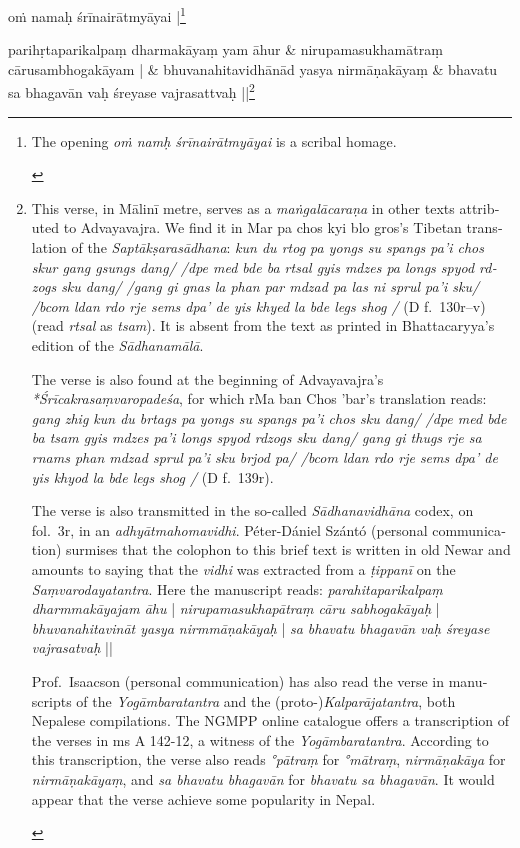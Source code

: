 \documentclass[naipra.tex]{subfiles}
\begin{document}
\beginnumbering
\begin{sanskrit}
\pstart\noindent
{}oṁ namaḥ śrīnairātmyāyai |\footnote{
	\begin{english}%
		The opening \emph{oṁ namḥ śrīnairātmyāyai} is a scribal homage.
	\end{english}
}
\pend

\medskip\versequote
parihṛtaparikalpaṃ dharmakāyaṃ yam āhur &
\hspace{20pt}nirupamasukhamātraṃ cārusambhogakāyam | \&
\versequote
bhuvanahitavidhānād yasya nirmāṇakāyaṃ &
\hspace{20pt}bhavatu sa bhagavān vaḥ śreyase vajrasattvaḥ ||\footnote{
	\begin{english}%
		This verse, in Mālinī metre, serves as a \emph{maṅgalācaraṇa} in other texts attributed to Advayavajra.
		We find it in Mar pa chos kyi blo gros's Tibetan translation of the \emph{Saptākṣarasādhana}: \emph{kun du rtog pa yongs su spangs pa'i chos skur gang gsungs dang/ /dpe med bde ba rtsal gyis mdzes pa longs spyod rdzogs sku dang/ /gang gi gnas la phan par mdzad pa las ni sprul pa'i sku/ /bcom ldan rdo rje sems dpa' de yis khyed la bde legs shog /} (D f.\ 130r–v) (read \emph{rtsal} as \emph{tsam}).
		It is absent from the text as printed in Bhattacaryya's edition of the \emph{Sādhanamālā}.

		The verse is also found at the beginning of Advayavajra's \emph{*Śrīcakrasaṃvaropadeśa}, for which rMa ban Chos 'bar's translation reads: \emph{gang zhig kun du brtags pa yongs su spangs pa'i chos sku dang/ /dpe med bde ba tsam gyis mdzes pa'i longs spyod rdzogs sku dang/ gang gi thugs rje sa rnams phan mdzad sprul pa'i sku brjod pa/ /bcom ldan rdo rje sems dpa' de yis khyod la bde legs shog /} (D f.\ 139r).

		The verse is also transmitted in the so-called \emph{Sādhanavidhāna} codex, on fol.\ 3r, in an \emph{adhyātmahomavidhi}.
		Péter-Dániel Szántó (personal communication) surmises that the colophon to this brief text is written in old Newar and amounts to saying that the \emph{vidhi} was extracted from a \emph{ṭippanī} on the \emph{Saṃvarodayatantra}. 
		Here the manuscript reads: \emph{parahitaparikalpaṃ dharmmakāyajam āhu} | \emph{nirupamasukhapātraṃ cāru sabhogakāyaḥ} | \emph{bhuvanahitavināt yasya nirmmāṇakāyaḥ} | \emph{sa bhavatu bhagavān vaḥ śreyase vajrasatvaḥ} ||

		Prof.\ Isaacson (personal communication) has also read the verse in manuscripts of the \emph{Yogāmbaratantra} and the (proto-)\emph{Kalparājatantra}, both Nepalese compilations.
		The NGMPP online catalogue offers a transcription of the verses in ms A 142-12, a witness of the \emph{Yogāmbaratantra}.
		According to this transcription, the verse also reads \emph{°pātraṃ} for \emph{°mātraṃ}, \emph{nirmāṇakāya} for \emph{nirmāṇakāyaṃ}, and \emph{sa bhavatu bhagavān} for \emph{bhavatu sa bhagavān}.
		It would appear that the verse achieve some popularity in Nepal.


\end{english}}
\end{sanskrit}
\end{document}
